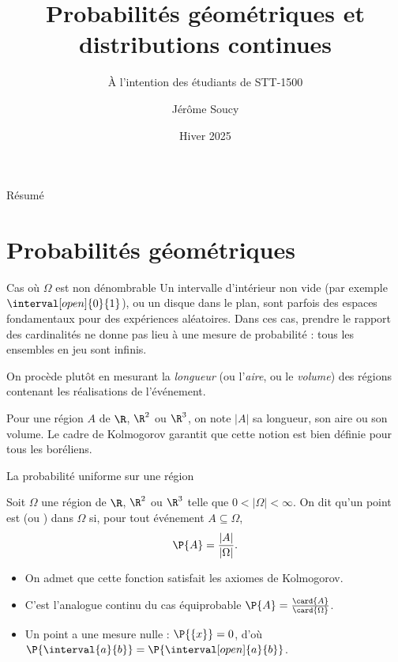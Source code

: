 \documentclass[nuit,charter,pied]{BeamerJS}
\title{Probabilités géométriques et distributions continues}
\subtitle{À l'intention des étudiants de STT-1500}
\institute{Université Laval}
\author{Jérôme Soucy}
\date{Hiver 2025}
\newcommand{\mesure}[1]{\lvert #1\rvert}
\begin{document}
\begin{frame}
	\titlepage
\end{frame}
\begin{frame}{Résumé}
\tableofcontents
\end{frame}

\section{Probabilités géométriques}

\begin{frame}[t]{Cas où \(\Omega\) est non dénombrable}
\pause
	Un intervalle d'intérieur non vide (par exemple \(\interval[open]{0}{1}\)), ou un disque dans le plan, sont parfois des espaces fondamentaux pour des expériences aléatoires. \pause Dans ces cas, prendre le rapport des cardinalités ne donne pas lieu à une mesure de probabilité : tous les ensembles en jeu sont infinis.
	\pause
	\medskip

	On procède plutôt en mesurant la \emph{longueur} (ou l'\emph{aire}, ou le \emph{volume}) des régions contenant les réalisations de l'événement.
	\pause
	\begin{lumiere}
		Pour une région \(A\) de \(\R\), \(\R^2\) ou \(\R^3\), on note \(\mesure{A}\) sa longueur, son aire ou son volume. Le cadre de Kolmogorov garantit que cette notion est bien définie pour tous les boréliens.
	\end{lumiere}
\end{frame}

\begin{frame}[t]{La probabilité uniforme sur une région}
\pause
	\begin{defn}
		Soit \(\Omega\) une région de \(\R\), \(\R^2\) ou \(\R^3\) telle que \(0<\mesure{\Omega}<\infty\). On dit qu'un point est  (ou ) dans \(\Omega\) si, pour tout événement \(A\subseteq\Omega\),
		\[\P{A}=\frac{\mesure{A}}{\mesure{\Omega}}.\]
	\end{defn}
	\pause
	\begin{rems}
		\begin{itemize}
			\item On admet que cette fonction satisfait les axiomes de Kolmogorov.\pause
			\item C'est l'analogue continu du cas équiprobable \(\P{A}=\frac{\card{A}}{\card{\Omega}}\).\pause
			\item Un point a une mesure nulle : \(\P{\{x\}}=0\), \pause d'où \(\P{\interval{a}{b}}=\P{\interval[open]{a}{b}}\).
		\end{itemize}
	\end{rems}
\end{frame}
\end{document}
